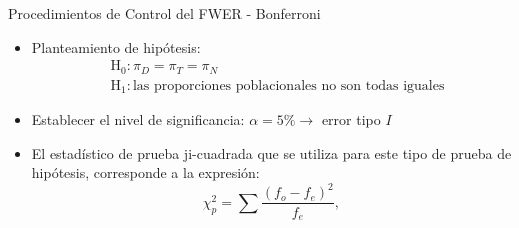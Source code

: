 \begin{frame}{Procedimientos de Control del FWER - Bonferroni}
\begin{example}[Continuación]
    \begin{itemize}
        \item Planteamiento de hipótesis:
		\begin{align*}
			&\mathrm{H}_{0}: \pi_{D}=\pi_{T}=\pi_{N}\\
			&\mathrm{H}_{1}: \text{las proporciones poblacionales no son todas iguales}
		\end{align*}

		\item  Establecer el nivel de significancia: $\alpha=5 \% \rightarrow$ error tipo $I$
		\item El estadístico de prueba ji-cuadrada que se utiliza para este tipo de prueba de hipótesis, corresponde a la expresión:
		$$
		\chi_{p}^{2}=\sum \frac{(f_o-f_e)^{2}}{f_e},
		$$
    \end{itemize}
\end{example}
\end{frame}

